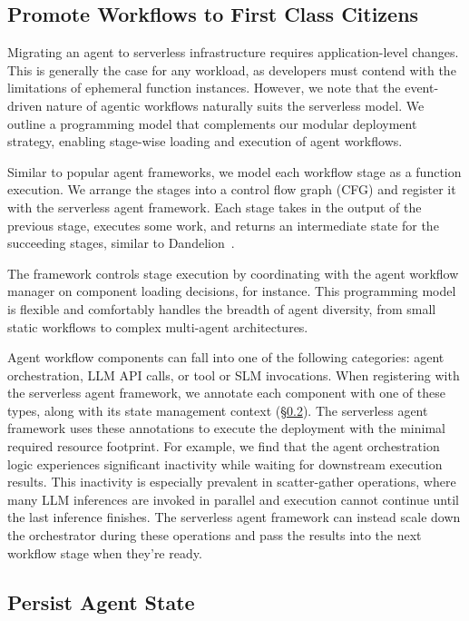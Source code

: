 \subsection{Promote Workflows to First Class Citizens}

Migrating an agent to serverless infrastructure requires application-level changes.
This is generally the case for any workload, as developers must contend with the limitations of ephemeral function instances.
However, we note that the event-driven nature of agentic workflows naturally suits the serverless model.
We outline a programming model that complements our modular deployment strategy, enabling stage-wise loading and execution of agent workflows.

Similar to popular agent frameworks, we model each workflow stage as a function execution.
We arrange the stages into a control flow graph (CFG) and register it with the serverless agent framework.
Each stage takes in the output of the previous stage, executes some work, and returns an intermediate state for the succeeding stages,
similar to Dandelion~\cite{kuchler2025unlockingtrueelasticitycloudnativedandelion}.

The framework controls stage execution by coordinating with the agent workflow manager on component loading decisions, for instance.
This programming model is flexible and comfortably handles the breadth of agent diversity, from small static workflows to complex multi-agent architectures.

Agent workflow components can fall into one of the following categories: agent orchestration, LLM API calls, or tool or SLM invocations.
When registering with the serverless agent framework, we annotate each component with one of these types, along with its state management context (\S\ref{section:state-management}).
The serverless agent framework uses these annotations to execute the deployment with the minimal required resource footprint.
For example, we find that the agent orchestration logic experiences significant inactivity while waiting for downstream execution results.
This inactivity is especially prevalent in scatter-gather operations, where many LLM inferences are invoked in parallel and execution cannot continue until the last inference finishes.
The serverless agent framework can instead scale down the orchestrator during these operations and pass the results into the next workflow stage when they're ready.

\subsection{Persist Agent State}
\label{section:state-management}

